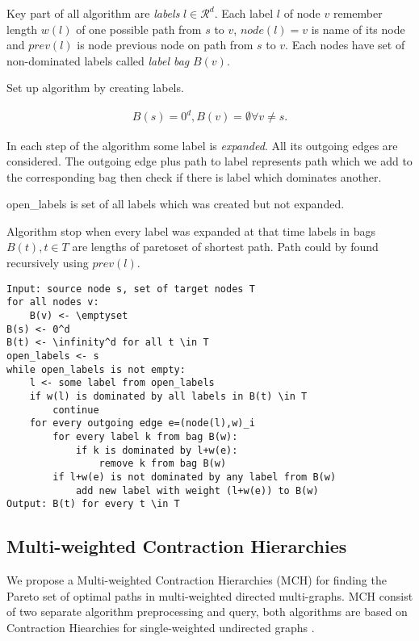 Key part of all algorithm are \emph{labels} $l\in \mathcal{R}^d$.
Each label $l$ of node $v$ remember length $w(l)$  of one 
possible path from $s$ to $v$, $node(l) = v$ is name of its node
and $prev(l)$ is node previous node on path from $s$ to $v$.
Each nodes have set of non-dominated labels called \emph{label bag} $B(v)$.

Set up algorithm by creating labels.

\begin{gather*} 
B(s)=0^d, B(v)=\emptyset \forall v \ne s.
\end{gather*} 

In each step of the algorithm some label is \emph{expanded}. 
All its outgoing edges are considered. 
The outgoing edge plus path to label represents 
path which we add to the corresponding bag then check if there
is label which dominates another.

open\_labels is set of all labels which was created but not expanded.

Algorithm stop when every label was expanded at that time
labels in bags $B(t), t \in T$ are lengths of paretoset of shortest path.
Path could by found recursively using $prev(l)$.


\begin{lstlisting}[caption={Meta Search Algorithm},label=list:8-6,captionpos=t,float,abovecaptionskip=-\medskipamount]
Input: source node s, set of target nodes T
for all nodes v:
	B(v) <- \emptyset
B(s) <- 0^d
B(t) <- \infinity^d for all t \in T
open_labels <- s
while open_labels is not empty:
	l <- some label from open_labels
    if w(l) is dominated by all labels in B(t) \in T
    	continue
    for every outgoing edge e=(node(l),w)_i
    	for every label k from bag B(w):
        	if k is dominated by l+w(e):
            	remove k from bag B(w)
        if l+w(e) is not dominated by any label from B(w)
        	add new label with weight (l+w(e)) to B(w)
Output: B(t) for every t \in T
\end{lstlisting}



\subsection{Multi-weighted Contraction Hierarchies}
We propose a Multi-weighted Contraction Hierarchies (MCH) for finding the Pareto set
of optimal paths in multi-weighted directed multi-graphs. 
MCH consist of two separate algorithm preprocessing and query,
both algorithms are based on Contraction Hiearchies 
for single-weighted undirected graphs \cite{geisberger2008contraction}.


